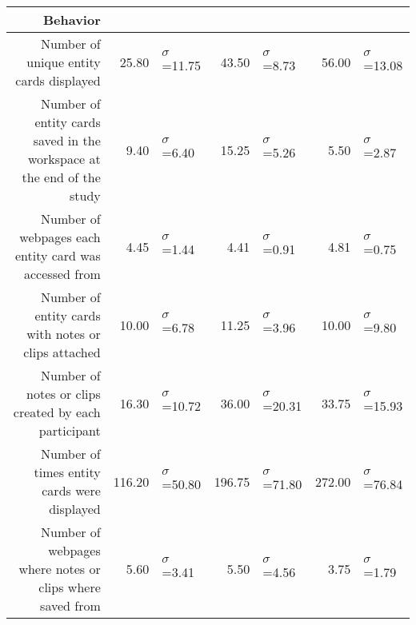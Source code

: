 \begin{table*}
\begin{tabular}{ r  r l   r l r l }
	\hline
	\multicolumn{1}{p{1\columnwidth}}{Behavior} &
	& &
	& &
	&\\
	\hline
    
	
	\multicolumn{1}{p{1.0\columnwidth}}{Number of unique entity cards displayed} &
    25.80 & $\sigma$=11.75&
    43.50 & $\sigma$=8.73 &
    56.00 & $\sigma$=13.08 \\
    
	\multicolumn{1}{p{1.0\columnwidth}}{Number of entity cards saved in the workspace at the end of the study} &
    9.40 & $\sigma$=6.40 &
    15.25 & $\sigma$=5.26 &
    5.50 & $\sigma$=2.87 \\
    
	\multicolumn{1}{p{1.0\columnwidth}}{Number of webpages each entity card was accessed from} &
    4.45 & $\sigma$=1.44 &
    4.41 & $\sigma$=0.91 &
    4.81 & $\sigma$=0.75 \\
    
	\multicolumn{1}{p{1.0\columnwidth}}{Number of entity cards with notes or clips attached} &
    10.00 & $\sigma$=6.78 &
    11.25 & $\sigma$=3.96 &
    10.00 & $\sigma$=9.80 \\
    
    
	\multicolumn{1}{p{1.0\columnwidth}}{Number of notes or clips created by each participant} &
    16.30 & $\sigma$=10.72 &
    36.00 & $\sigma$=20.31 &
    33.75 & $\sigma$=15.93 \\
    
	\multicolumn{1}{p{1.0\columnwidth}}{Number of times entity cards were displayed} &
    116.20 & $\sigma$=50.80 &
    196.75 & $\sigma$=71.80 &
    272.00 & $\sigma$=76.84 \\
    
	\multicolumn{1}{p{1.0\columnwidth}}{Number of webpages where notes or clips where saved from} &
    5.60 & $\sigma$=3.41 &
    5.50 & $\sigma$=4.56 &
    3.75 & $\sigma$=1.79 \\
    
    
     

\end{tabular}
\end{table*}
